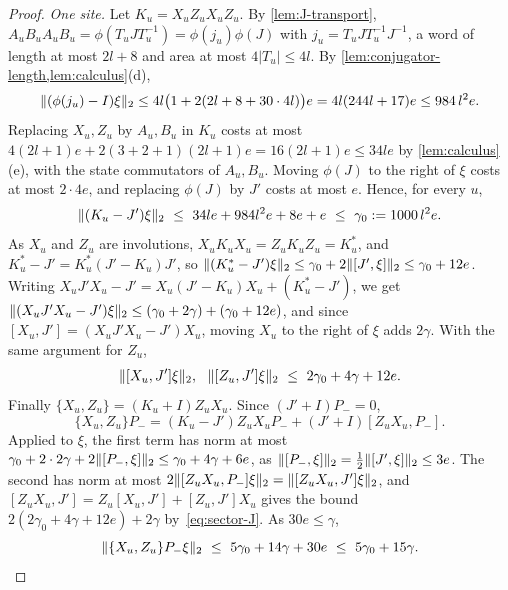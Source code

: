 \begin{proof}
\emph{One site.} Let $K_u=X_uZ_uX_uZ_u$. By \cref{lem:J-transport}, $A_uB_uA_uB_u=\phi(T_uJT_u^{-1})=\phi(j_u)\phi(J)$ with
$j_u=T_uJT_u^{-1}J^{-1}$, a word of length at most $2l+8$ and area at most $4\lvert T_u\rvert\le4l$. By
\cref{lem:conjugator-length,lem:calculus}(d),
\[
\lVert (\phi(j_u)-I)\xi\rVert_2\le4l\bigl(1+2(2l+8+30\cdot4l)\bigr)e=4l(244l+17)e\le984\,l^2e .
\]
Replacing $X_u,Z_u$ by $A_u,B_u$ in $K_u$ costs at most $4(2l+1)e+2(3+2+1)(2l+1)e=16(2l+1)e\le34le$ by \cref{lem:calculus}(e), with the
state commutators of $A_u,B_u$. Moving $\phi(J)$ to the right of $\xi$ costs at most $2\cdot4e$, and replacing $\phi(J)$ by $J'$ costs at
most $e$. Hence, for every $u$,
\[
\hs{(K_u-J')\xi}\ \le\ 34le+984l^2e+8e+e\ \le\ \gamma_0:=1000\,l^2e .
\]
As $X_u$ and $Z_u$ are involutions, $X_uK_uX_u=Z_uK_uZ_u=K_u^*$, and $K_u^*-J'=K_u^*(J'-K_u)J'$, so
$\lVert (K_u^*-J')\xi\rVert_2\le\gamma_0+2\lVert [J',\xi]\rVert_2\le\gamma_0+12e$. Writing $X_uJ'X_u-J'=X_u(J'-K_u)X_u+(K_u^*-J')$, we get
$\lVert (X_uJ'X_u-J')\xi\rVert_2\le(\gamma_0+2\gamma)+(\gamma_0+12e)$, and since $[X_u,J']=(X_uJ'X_u-J')X_u$, moving $X_u$ to the right of $\xi$ adds
$2\gamma$. With the same argument for $Z_u$,
\begin{equation}\label{eq:sector-J}
\lVert [X_u,J']\xi\rVert_2,\ \ \lVert [Z_u,J']\xi\rVert_2\ \le\ 2\gamma_0+4\gamma+12e .
\end{equation}
Finally $\{X_u,Z_u\}=(K_u+I)Z_uX_u$. Since $(J'+I)P_-=0$,
\[
\{X_u,Z_u\}P_-=(K_u-J')Z_uX_uP_-+(J'+I)[Z_uX_u,P_-] .
\]
Applied to $\xi$, the first term has norm at most $\gamma_0+2\cdot2\gamma+2\lVert [P_-,\xi]\rVert_2\le\gamma_0+4\gamma+6e$, as
$\lVert [P_-,\xi]\rVert_2=\frac12\lVert [J',\xi]\rVert_2\le3e$. The second has norm at most $2\lVert [Z_uX_u,P_-]\xi\rVert_2=\lVert [Z_uX_u,J']\xi\rVert_2$, and
$[Z_uX_u,J']=Z_u[X_u,J']+[Z_u,J']X_u$ gives the bound $2(2\gamma_0+4\gamma+12e)+2\gamma$ by~\eqref{eq:sector-J}. As $30e\le\gamma$,
\begin{equation}\label{eq:sector-anti}
\hs{\{X_u,Z_u\}P_-\xi}\ \le\ 5\gamma_0+14\gamma+30e\ \le\ 5\gamma_0+15\gamma .
\end{equation}


\end{proof}
